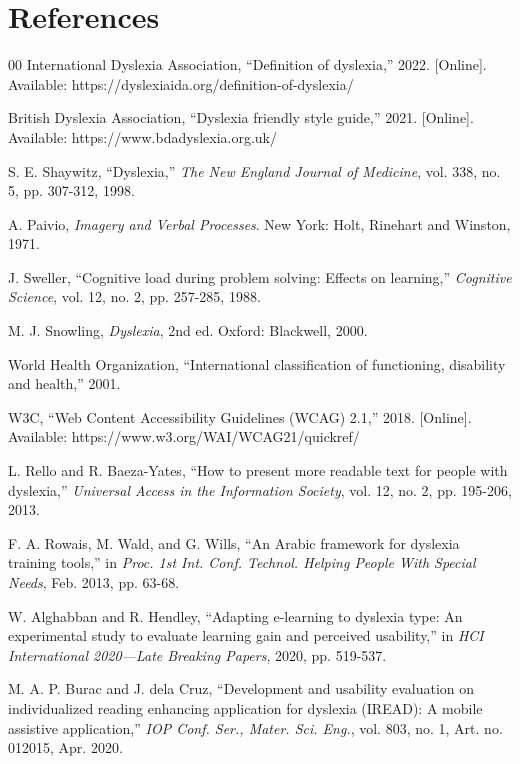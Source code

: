 \documentclass[journal]{IEEEtran}
\begin{document}
\section*{References}

\begin{thebibliography}{00}
 International Dyslexia Association, ``Definition of dyslexia,'' 2022. [Online]. Available: https://dyslexiaida.org/definition-of-dyslexia/

 British Dyslexia Association, ``Dyslexia friendly style guide,'' 2021. [Online]. Available: https://www.bdadyslexia.org.uk/

 S. E. Shaywitz, ``Dyslexia,'' \textit{The New England Journal of Medicine}, vol. 338, no. 5, pp. 307-312, 1998.

 A. Paivio, \textit{Imagery and Verbal Processes}. New York: Holt, Rinehart and Winston, 1971.

 J. Sweller, ``Cognitive load during problem solving: Effects on learning,'' \textit{Cognitive Science}, vol. 12, no. 2, pp. 257-285, 1988.

 M. J. Snowling, \textit{Dyslexia}, 2nd ed. Oxford: Blackwell, 2000.

 World Health Organization, ``International classification of functioning, disability and health,'' 2001.

 W3C, ``Web Content Accessibility Guidelines (WCAG) 2.1,'' 2018. [Online]. Available: https://www.w3.org/WAI/WCAG21/quickref/

 L. Rello and R. Baeza-Yates, ``How to present more readable text for people with dyslexia,'' \textit{Universal Access in the Information Society}, vol. 12, no. 2, pp. 195-206, 2013.

 F. A. Rowais, M. Wald, and G. Wills, ``An Arabic framework for dyslexia training tools,'' in \textit{Proc. 1st Int. Conf. Technol. Helping People With Special Needs}, Feb. 2013, pp. 63-68.

 W. Alghabban and R. Hendley, ``Adapting e-learning to dyslexia type: An experimental study to evaluate learning gain and perceived usability,'' in \textit{HCI International 2020—Late Breaking Papers}, 2020, pp. 519-537.

 M. A. P. Burac and J. dela Cruz, ``Development and usability evaluation on individualized reading enhancing application for dyslexia (IREAD): A mobile assistive application,'' \textit{IOP Conf. Ser., Mater. Sci. Eng.}, vol. 803, no. 1, Art. no. 012015, Apr. 2020.


\end{thebibliography}
\end{document}
